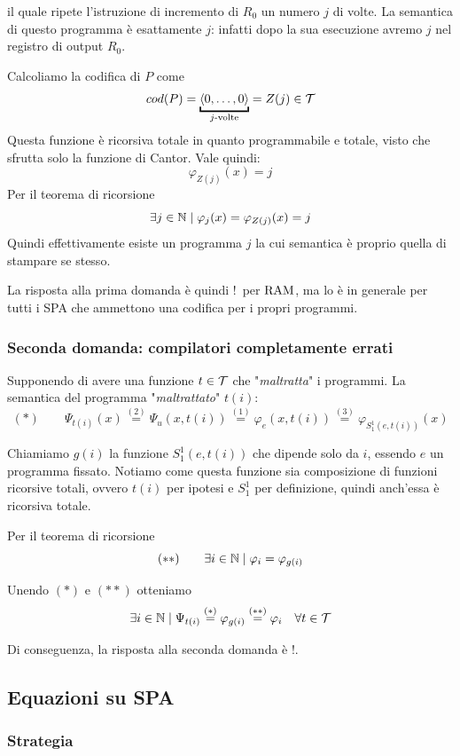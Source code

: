 il quale ripete l'istruzione di incremento di $R_0$ un numero $j$ di volte. La semantica di questo programma è esattamente $j$: infatti dopo la sua esecuzione avremo $j$ nel registro di output $R_0$.

Calcoliamo la codifica di $P$ come
$$ cod(P) = \underbracket{\langle 0, \dots, 0 \rangle}_{j\text{-volte}} = Z (j) \in \T $$
Questa funzione è ricorsiva totale in quanto programmabile e totale, visto che sfrutta solo la funzione di Cantor. Vale quindi:
$$ \varphi_{Z(j)} (x) = j $$
Per il teorema di ricorsione
$$ \exists j \in \mathbb{N} \mid \varphi_j (x) = \varphi_{Z (j)} (x) = j $$
Quindi effettivamente esiste un programma $j$ la cui semantica è proprio quella di stampare se stesso.

La risposta alla prima domanda è quindi \si! per $\text{RAM}$, ma lo è in generale per tutti i SPA che ammettono una codifica per i propri programmi.

\subsubsection{Seconda domanda: compilatori completamente errati}

Supponendo di avere una funzione $t \in \mathcal{T}$ che "\textit{maltratta}" i programmi. La semantica del programma "\textit{maltrattato}" $t(i)$:
$$ (\ast) \quad \quad \Psi_{t(i)} (x) \stackrel{(2)}{=} \Psi_u (x, t(i)) \stackrel{(1)}{=} \varphi_e (x, t(i)) \stackrel{(3)}{=} \varphi_{S_1^1 (e,t(i))} (x) $$

Chiamiamo $g(i)$ la funzione $S_1^1 (e, t(i))$ che dipende solo da $i$, essendo $e$ un programma fissato. Notiamo come questa funzione sia composizione di funzioni ricorsive totali, ovvero $t(i)$ per ipotesi e $S^1_1$ per definizione, quindi anch'essa è ricorsiva totale.

Per il teorema di ricorsione
$$ (\ast \ast) \quad \quad \exists i \in \mathbb{N} \mid \varphi_i = \varphi_{g(i)} $$

Unendo $(\ast)$ e $(\ast \ast)$ otteniamo
$$ \exists i \in \mathbb{N} \mid \Psi_{t(i)} \stackrel{(\ast)}{=} \varphi_{g(i)} \stackrel{(\ast \ast)}{=} \varphi_i \quad \forall t \in \mathcal{T} $$

Di conseguenza, la risposta alla seconda domanda è \no!.

\subsection{Equazioni su SPA}
\subsubsection{Strategia}

